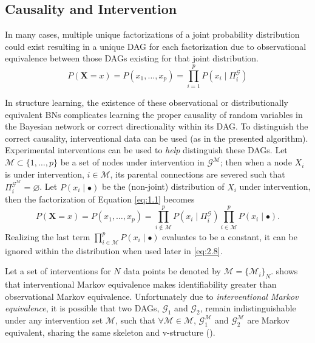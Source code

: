 \documentclass[twoside,11pt]{article}
\let\mc\mathcal
\newcommand{\bmc}[1]{\bm{\mc{#1}}}
\let\mbf\mathbf
\begin{document}
\subsection{Causality and Intervention}

In many cases, multiple unique factorizations of a joint probability distribution could exist resulting in a unique DAG for each factorization due to observational equivalence between those DAGs existing for that joint distribution.
\begin{equation}
    P(\mbf{X} = x) = P(x_1,\dots,x_p) = \prod_{i=1}^{p}P(x_i\mid \Pi^\mc{G}_i) \label{eq:1.1}
\end{equation}

In structure learning, the existence of these observational or distributionally equivalent BNs complicates learning the proper causality of random variables in the Bayesian network or correct directionality within its DAG. To distinguish the correct causality, interventional data can be used (as in the presented algorithm). Experimental interventions can be used to \textit{help} distinguish these DAGs. Let $\mc{M}\subset\{1,\dots,p\}$ be a set of nodes under intervention in $\mc{G}^\mc{M}$; then when a node $X_i$ is under intervention, $i\in \mc{M}$, its parental connections are severed such that $\Pi^{\mc{G}^\mc{M}}_i=\varnothing$. Let $P(x_i\mid\bullet)$ be the (non-joint) distribution of $X_i$ under intervention, then the factorization of Equation \eqref{eq:1.1} becomes
\begin{equation}
    P(\mbf{X} = x) = P(x_1,\dots,x_p) = \prod_{i\not\in\mc{M}}^{p}P(x_i\mid \Pi^\mc{G}_i)\prod_{i\in\mc{M}}^{p}P(x_i\mid \bullet). \label{eq:1.2}
\end{equation}
\noindent Realizing the last term $\prod_{i\in\mc{M}}^{p}P(x_i\mid \bullet)$ evaluates to be a constant, it can be ignored within the distribution when used later in \eqref{eq:2.8}.

Let a set of interventions for $N$ data points be denoted by $\bm{\mc{M}}=\{\mc{M}_i\}_N$. \citeauthor{hauser2012} shows that interventional Markov equivalence makes identifiability greater than observational Markov equivalence. Unfortunately due to \textit{interventional Markov equivalence}, it is possible that two DAGs, $\mc{G}_1$ and $\mc{G}_2$, remain indistinguishable under any intervention set $\mc{M}$, such that $\forall\mc{M}\in\bmc{M}$,  $\mc{G}^\mc{M}_1$ and $\mc{G}^\mc{M}_2$ are Markov equivalent, sharing the same skeleton and v-structure (\cite{hauser2012}). 
\end{document}
